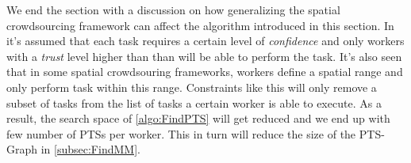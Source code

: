 We end the section with a discussion on how generalizing the spatial crowdsourcing framework can affect the algorithm introduced in this section. In \cite{Kazemi13} it's assumed that each task requires a certain level of \emph{confidence} and only workers with a \emph{trust} level higher than than will be able to perform the task. It's also seen that in some spatial crowdsouring frameworks, workers define a spatial range and only perform task within this range. Constraints like this will only remove a subset of tasks from the list of tasks a certain worker is able to execute. As a result, the search space of \cref{algo:FindPTS} will get reduced and we end up with few number of PTSs per worker. This in turn will reduce the size of the PTS-Graph in \cref{subsec:FindMM}.